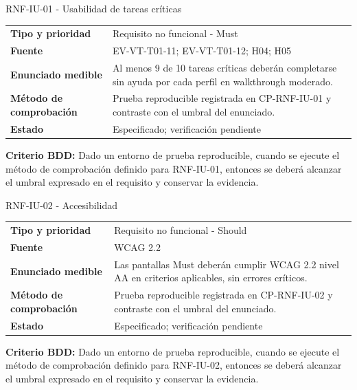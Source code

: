 \begin{reqbox}[colframe=Teal]{RNF-IU-01 - Usabilidad de tareas críticas}
\begin{tabularx}{\textwidth}{>{\bfseries}p{3.2cm}Y}
Tipo y prioridad & Requisito no funcional - Must \\
Fuente & EV-VT-T01-11; EV-VT-T01-12; H04; H05 \\
Enunciado medible & Al menos 9 de 10 tareas críticas deberán completarse sin ayuda por cada perfil en walkthrough moderado. \\
Método de comprobación & Prueba reproducible registrada en CP-RNF-IU-01 y contraste con el umbral del enunciado. \\
Estado & Especificado; verificación pendiente \\
\end{tabularx}
\textbf{Criterio BDD:} Dado un entorno de prueba reproducible, cuando se ejecute el método de comprobación definido para RNF-IU-01, entonces se deberá alcanzar el umbral expresado en el requisito y conservar la evidencia.
\end{reqbox}


\begin{reqbox}[colframe=Teal]{RNF-IU-02 - Accesibilidad}
\begin{tabularx}{\textwidth}{>{\bfseries}p{3.2cm}Y}
Tipo y prioridad & Requisito no funcional - Should \\
Fuente & WCAG 2.2 \\
Enunciado medible & Las pantallas Must deberán cumplir WCAG 2.2 nivel AA en criterios aplicables, sin errores críticos. \\
Método de comprobación & Prueba reproducible registrada en CP-RNF-IU-02 y contraste con el umbral del enunciado. \\
Estado & Especificado; verificación pendiente \\
\end{tabularx}
\textbf{Criterio BDD:} Dado un entorno de prueba reproducible, cuando se ejecute el método de comprobación definido para RNF-IU-02, entonces se deberá alcanzar el umbral expresado en el requisito y conservar la evidencia.
\end{reqbox}


